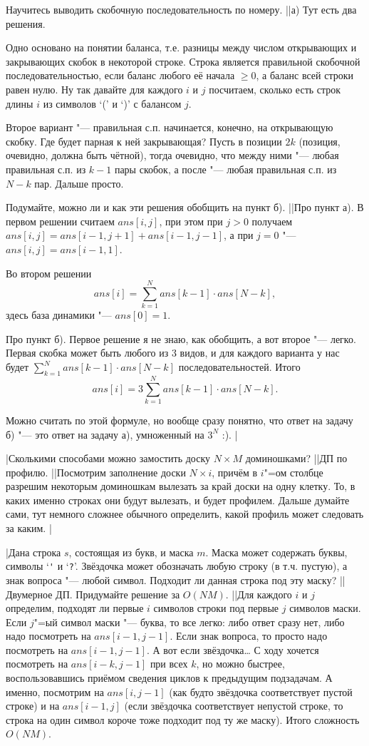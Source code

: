 Научитесь выводить скобочную последовательность по номеру.
||а) Тут есть два решения. 

Одно основано на понятии баланса, т.е. разницы между числом открывающих и закрывающих скобок в некоторой строке. Строка является правильной скобочной последовательностью, если баланс любого её начала $\geq 0$, а баланс всей строки равен нулю. Ну так давайте для каждого $i$ и $j$ посчитаем, сколько есть строк длины $i$ из символов `(' и `)' с балансом $j$.

Второе вариант "--- правильная с.п. начинается, конечно, на открывающую скобку. Где будет парная к ней закрывающая? Пусть в позиции $2k$ (позиция, очевидно, должна быть чётной), тогда очевидно, что между ними "--- любая правильная с.п. из $k-1$ пары скобок, а после "--- любая правильная с.п. из $N-k$ пар. Дальше просто.

Подумайте, можно ли и как эти решения обобщить на пункт б).
||Про пункт а). В первом решении считаем $ans[i,j]$, при этом при $j>0$ получаем $ans[i,j]=ans[i-1,j+1]+ans[i-1,j-1]$, а при $j=0$ "--- $ans[i,j]=ans[i-1,1]$. 

Во втором решении 
$$
ans[i]=\sum_{k=1}^N ans[k-1]\cdot ans[N-k],
$$
здесь база динамики "--- $ans[0]=1$.

Про пункт б). Первое решение я не знаю, как обобщить, а вот второе "--- легко. Первая скобка может быть любого из 3 видов, и для каждого варианта у нас будет $\sum_{k=1}^N ans[k-1]\cdot ans[N-k]$ последовательностей. Итого
$$
ans[i]=3\sum_{k=1}^N ans[k-1]\cdot ans[N-k].
$$

Можно считать по этой формуле, но вообще сразу понятно, что ответ на задачу б) "--- это ответ на задачу а), умноженный на $3^N$ :).
|

\task|Сколькими способами можно замостить доску $N\times M$ доминошками?
||ДП по профилю.
||Посмотрим заполнение доски $N\times i$, причём в $i$"=ом столбце разрешим некоторым доминошкам вылезать за край доски на одну клетку. То, в каких именно строках они будут вылезать, и будет профилем. Дальше думайте сами, тут немного сложнее обычного определить, какой профиль может следовать за каким.
|

\task|Дана строка $s$, состоящая из букв, и маска $m$. Маска может содержать буквы, символы `\texttt *' и `\texttt ?'. Звёздочка может обозначать любую строку (в т.ч. пустую), а знак вопроса "--- любой символ. Подходит ли данная строка под эту маску?
||Двумерное ДП. Придумайте решение за $O(NM)$.
||Для каждого $i$ и $j$ определим, подходят ли первые $i$ символов строки под первые $j$ символов маски. Если $j$"=ый символ маски "--- буква, то все легко: либо ответ сразу нет, либо надо посмотреть на $ans[i-1,j-1]$. Если знак вопроса, то просто надо посмотреть на $ans[i-1,j-1]$. А вот если звёздочка\dots{} С ходу хочется посмотреть на $ans[i-k,j-1]$ при всех $k$, но можно быстрее, воспользовавшись приёмом сведения циклов к предыдущим подзадачам. А именно, посмотрим на $ans[i,j-1]$ (как будто звёздочка соответствует пустой строке) и на $ans[i-1,j]$ (если звёздочка соответствует непустой строке, то строка на один символ короче тоже подходит под ту же маску). Итого сложность $O(NM)$.

